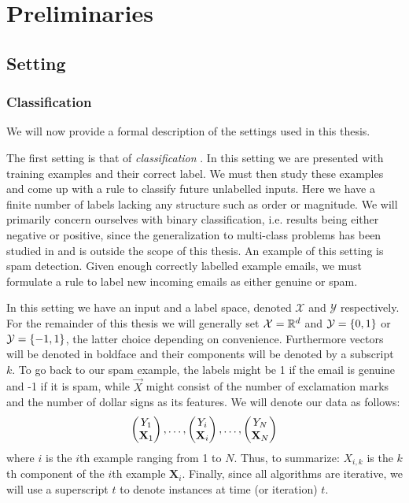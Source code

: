 
\chapter{Preliminaries}
\label{chap:prelim}
\section{Setting}
\subsection{Classification} 
\label{subsec:class}
We will now provide a formal description of the settings used in this thesis.
\par The first setting is that of \textit{classification} \cite{Hastie2009}. In this setting we are presented with training examples and their correct label. We must then study these examples and come up with a rule to classify future unlabelled inputs. Here we have a finite number of labels lacking any structure such as order or magnitude. We will primarily concern ourselves with binary classification, i.e. results being either negative or positive, since the generalization to multi-class problems has been studied in \cite{Freund1997} and is outside the scope of this thesis. An example of this setting is spam detection. Given enough correctly labelled example emails, we must formulate a rule to label new incoming emails as either genuine or spam. 
\par In this setting we have an input and a label space, denoted $\mathcal X$ and $\mathcal Y$ respectively. For the remainder of this thesis we will generally set $\mathcal X = \R^d$ and $\mathcal Y = \set{0,1}$ or $\mathcal Y = \set{-1,1}$, the latter choice depending on convenience. 
Furthermore vectors will be denoted in boldface and their components will be denoted by a subscript $k$. To go back to our spam example, the labels might be 1 if the email is genuine and -1 if it is spam, while $\vec X$ might consist of the number of exclamation marks and the number of dollar signs as its features. We will denote our data as follows: $$\Vec{Y_1\\ \mathbf X_1},\ldots, \Vec{Y_i\\ \mathbf X_i},\ldots,\Vec{Y_N\\ \mathbf X_N}$$ where $i$ is the $i$th example ranging from 1 to $N$. Thus, to summarize: $X_{i,k}$ is the $k$th component of the $i$th example $\mathbf X_i$. Finally, since all algorithms are iterative, we will use a superscript $t$ to denote instances at time (or iteration) $t$.

